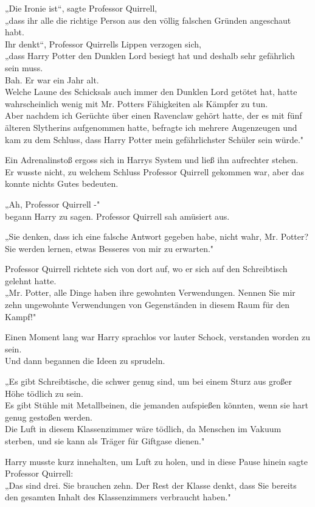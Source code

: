 {„Die Ironie ist“, sagte Professor Quirrell,\\ „dass ihr alle die richtige Person aus den völlig falschen Gründen angeschaut habt.\\ Ihr denkt“, Professor Quirrells Lippen verzogen sich,\\ „dass Harry Potter den Dunklen Lord besiegt hat und deshalb sehr gefährlich sein muss.\\ Bah. Er war ein Jahr alt.\\ Welche Laune des Schicksals auch immer den Dunklen Lord getötet hat, hatte wahrscheinlich wenig mit Mr. Potters Fähigkeiten als Kämpfer zu tun.\\ Aber nachdem ich Gerüchte über einen Ravenclaw gehört hatte, der es mit fünf älteren Slytherins aufgenommen hatte, befragte ich mehrere Augenzeugen und kam zu dem Schluss, dass Harry Potter mein gefährlichster Schüler sein würde."

Ein Adrenalinstoß ergoss sich in Harrys System und ließ ihn aufrechter stehen.\\ Er wusste nicht, zu welchem Schluss Professor Quirrell gekommen war, aber das konnte nichts Gutes bedeuten.

„Ah, Professor Quirrell -"\\ begann Harry zu sagen. Professor Quirrell sah amüsiert aus.

„Sie denken, dass ich eine falsche Antwort gegeben habe, nicht wahr, Mr. Potter? Sie werden lernen, etwas Besseres von mir zu erwarten."

Professor Quirrell richtete sich von dort auf, wo er sich auf den Schreibtisch gelehnt hatte.\\ „Mr. Potter, alle Dinge haben ihre gewohnten Verwendungen. Nennen Sie mir zehn ungewohnte Verwendungen von Gegenständen in diesem Raum für den Kampf!"

Einen Moment lang war Harry sprachlos vor lauter Schock, verstanden worden zu sein.\\ Und dann begannen die Ideen zu sprudeln.

„Es gibt Schreibtische, die schwer genug sind, um bei einem Sturz aus großer Höhe tödlich zu sein.\\ Es gibt Stühle mit Metallbeinen, die jemanden aufspießen könnten, wenn sie hart genug gestoßen werden.\\ Die Luft in diesem Klassenzimmer wäre tödlich, da Menschen im Vakuum sterben, und sie kann als Träger für Giftgase dienen."

Harry musste kurz innehalten, um Luft zu holen, und in diese Pause hinein sagte Professor Quirrell:\\ „Das sind drei. Sie brauchen zehn. Der Rest der Klasse denkt, dass Sie bereits den gesamten Inhalt des Klassenzimmers verbraucht haben."

}

